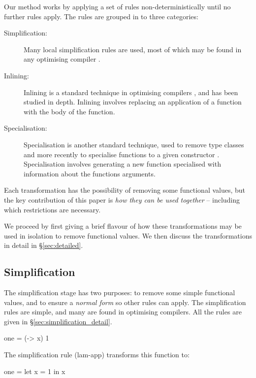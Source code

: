 \documentclass[preprint]{sigplanconf}
\begin{document}
Our method works by applying a set of rules non-deterministically until no further rules apply. The rules are grouped in to three categories:

\begin{description}
\item[Simplification:] Many local simplification rules are used, most of which may be found in any optimising compiler \cite{spj:transformation}.
\item[Inlining:] Inlining is a standard technique in optimising compilers \cite{spj:inlining}, and has been studied in depth. Inlining involves replacing an application of a function with the body of the function.
\item[Specialisation:] Specialisation is another standard technique, used to remove type classes \cite{jones:dictionary_free} and more recently to specialise functions to a given constructor \cite{spj:specconstr}. Specialisation involves generating a new function specialised with information about the functions arguments.
\end{description}

Each transformation has the possibility of removing some functional values, but the key contribution of this paper is \textit{how they can be used together} -- including which restrictions are necessary.

We proceed by first giving a brief flavour of how these transformations may be used in isolation to remove functional values. We then discuss the transformations in detail in \S\ref{sec:detailed}.

\subsection{Simplification}

The simplification stage has two purposes: to remove some simple functional values, and to ensure a \textit{normal form} so other rules can apply. The simplification rules are simple, and many are found in optimising compilers. All the rules are given in \S\ref{sec:simplification_detail}.

\begin{example}
\begin{code}
one = (\x -> x) 1
\end{code}

\noindent The simplification rule (lam-app) transforms this function to:

\begin{code}
one = let x = 1 in x
\end{code}\codeexample
\end{example}\smallskip
\end{document}
